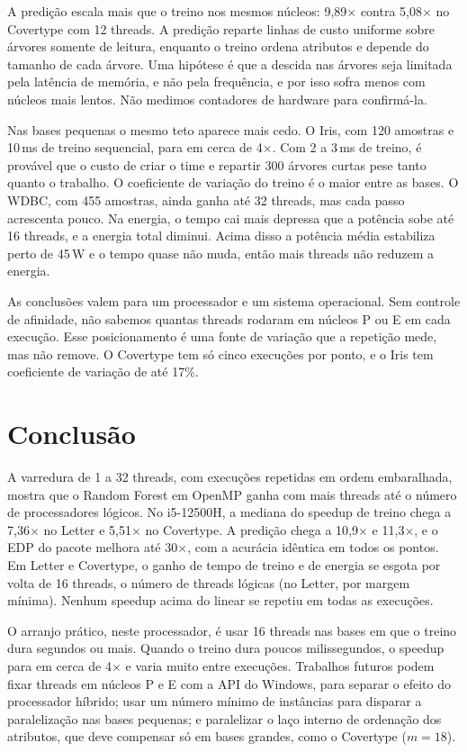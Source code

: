\documentclass[12pt]{article}
\begin{document}
A predição escala mais que o treino nos mesmos núcleos: 9{,}89$\times$ contra
5{,}08$\times$ no Covertype com 12 threads. A predição reparte linhas de custo
uniforme sobre árvores somente de leitura, enquanto o treino ordena atributos e
depende do tamanho de cada árvore. Uma hipótese é que a descida nas árvores seja
limitada pela latência de memória, e não pela frequência, e por isso sofra menos
com núcleos mais lentos. Não medimos contadores de hardware para confirmá-la.

Nas bases pequenas o mesmo teto aparece mais cedo. O Iris, com 120 amostras e
10\,ms de treino sequencial, para em cerca de 4$\times$. Com 2 a 3\,ms de treino, é provável que o custo
de criar o time e repartir 300 árvores curtas pese tanto quanto o trabalho. O
coeficiente de variação do treino é o maior entre as bases. O WDBC, com 455 amostras, ainda
ganha até 32 threads, mas cada passo acrescenta pouco. Na energia, o tempo cai mais
depressa que a potência sobe até 16 threads, e a energia total diminui. Acima disso
a potência média estabiliza perto de 45\,W e o tempo quase não muda, então mais
threads não reduzem a energia.

As conclusões valem para um processador e um sistema operacional. Sem controle de
afinidade, não sabemos quantas threads rodaram em núcleos P ou E em cada execução.
Esse posicionamento é uma fonte de variação que a repetição mede, mas não remove.
O Covertype tem só cinco execuções por ponto, e o Iris tem coeficiente de variação
de até 17\%.

\section{Conclusão}
\label{sec:conc}

A varredura de 1 a 32 threads, com execuções repetidas em ordem embaralhada,
mostra que o Random Forest em OpenMP ganha com mais threads até o número de
processadores lógicos. No i5-12500H, a mediana do speedup de
treino chega a 7{,}36$\times$ no Letter e 5{,}51$\times$ no Covertype. A predição
chega a 10{,}9$\times$ e 11{,}3$\times$, e o EDP do pacote melhora até 30$\times$,
com a acurácia idêntica em todos os pontos. Em Letter e Covertype, o ganho de tempo de
treino e de energia se esgota por volta de 16 threads, o número de threads lógicas
(no Letter, por margem mínima).
Nenhum speedup acima do linear se repetiu em todas as execuções.

O arranjo prático, neste processador, é usar 16 threads nas bases em que o
treino dura segundos ou mais. Quando o treino dura poucos milissegundos, o speedup
para em cerca de 4$\times$ e varia muito entre execuções. Trabalhos futuros podem fixar threads em
núcleos P e E com a API do Windows, para separar o efeito do processador híbrido;
usar um número mínimo de instâncias para disparar a paralelização nas bases
pequenas; e paralelizar o laço interno de ordenação dos atributos, que deve compensar
só em bases grandes, como o Covertype ($m = 18$).



\end{document}
